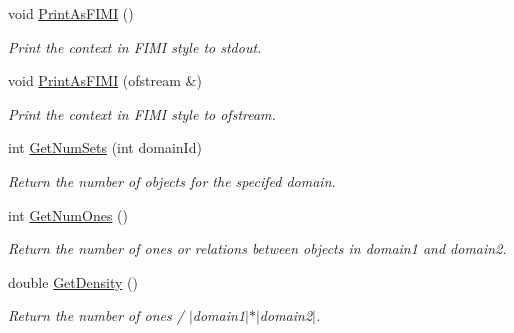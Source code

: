 \begin{DoxyCompactItemize}
void \hyperlink{class_context_a1ce45f00711d65af754a964a2b41623d}{PrintAsFIMI} ()
\begin{DoxyCompactList}\small\item\em Print the context in FIMI style to stdout. \item\end{DoxyCompactList}\item 
void \hyperlink{class_context_a15e5ec1fe7cddd0348c61f59733aed6e}{PrintAsFIMI} (ofstream \&)
\begin{DoxyCompactList}\small\item\em Print the context in FIMI style to ofstream. \item\end{DoxyCompactList}\item 
int \hyperlink{class_context_a17e73342fcd3d9cd96e2445e48c52275}{GetNumSets} (int domainId)
\begin{DoxyCompactList}\small\item\em Return the number of objects for the specifed domain. \item\end{DoxyCompactList}\item 
int \hyperlink{class_context_a54d9dcce403fb8f8f68118e6d420ce66}{GetNumOnes} ()
\begin{DoxyCompactList}\small\item\em Return the number of ones or relations between objects in domain1 and domain2. \item\end{DoxyCompactList}\item 
double \hyperlink{class_context_a1f3efbbcf1693d03bb6c4a8140312c83}{GetDensity} ()
\begin{DoxyCompactList}\small\item\em Return the number of ones / $|$domain1$|$$\ast$$|$domain2$|$. \item\end{DoxyCompactList}\end{DoxyCompactItemize}
